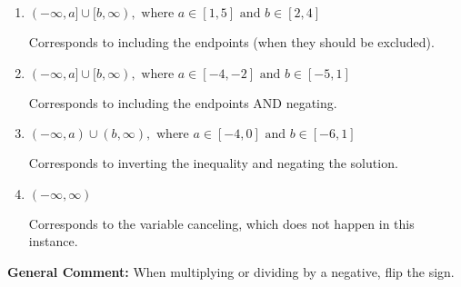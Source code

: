 \documentclass{extbook}[14pt]
\begin{document}
\begin{enumerate}
{\begin{enumerate}[label=\Alph*.]
 * Correct option.
\item \( (-\infty, a] \cup [b, \infty), \text{ where } a \in [1, 5] \text{ and } b \in [2, 4] \)

Corresponds to including the endpoints (when they should be excluded).
\item \( (-\infty, a] \cup [b, \infty), \text{ where } a \in [-4, -2] \text{ and } b \in [-5, 1] \)

Corresponds to including the endpoints AND negating.
\item \( (-\infty, a) \cup (b, \infty), \text{ where } a \in [-4, 0] \text{ and } b \in [-6, 1] \)

Corresponds to inverting the inequality and negating the solution.
\item \( (-\infty, \infty) \)

Corresponds to the variable canceling, which does not happen in this instance.
\end{enumerate}

\textbf{General Comment:} When multiplying or dividing by a negative, flip the sign.
}
\end{enumerate}
\end{document}
